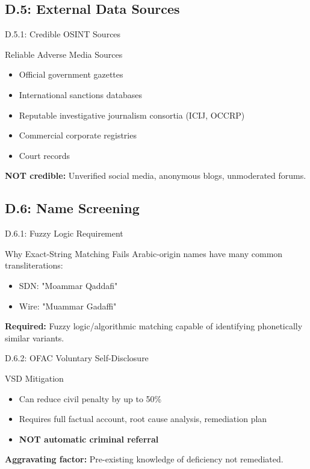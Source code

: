 \documentclass{beamer}
\begin{document}
		\subsection{D.5: External Data Sources}
		
		\begin{frame}{D.5.1: Credible OSINT Sources}
			\begin{block}{Reliable Adverse Media Sources}
				\begin{itemize}
					\item Official government gazettes
					\item International sanctions databases
					\item Reputable investigative journalism consortia (ICIJ, OCCRP)
					\item Commercial corporate registries
					\item Court records
				\end{itemize}
			\end{block}
			\textbf{NOT credible:} Unverified social media, anonymous blogs, unmoderated forums.
		\end{frame}
		
		\subsection{D.6: Name Screening}
		
		\begin{frame}{D.6.1: Fuzzy Logic Requirement}
			\begin{block}{Why Exact-String Matching Fails}
				Arabic-origin names have many common transliterations:
				\begin{itemize}
					\item SDN: "Moammar Qaddafi"
					\item Wire: "Muammar Gadaffi"
				\end{itemize}
			\end{block}
			\textbf{Required:} Fuzzy logic/algorithmic matching capable of identifying phonetically similar variants.
		\end{frame}
		
		\begin{frame}{D.6.2: OFAC Voluntary Self-Disclosure}
			\begin{block}{VSD Mitigation}
				\begin{itemize}
					\item Can reduce civil penalty by up to 50\%
					\item Requires full factual account, root cause analysis, remediation plan
					\item \textbf{NOT automatic criminal referral}
				\end{itemize}
			\end{block}
			\textbf{Aggravating factor:} Pre-existing knowledge of deficiency not remediated.
		\end{frame}
		
\end{document}
